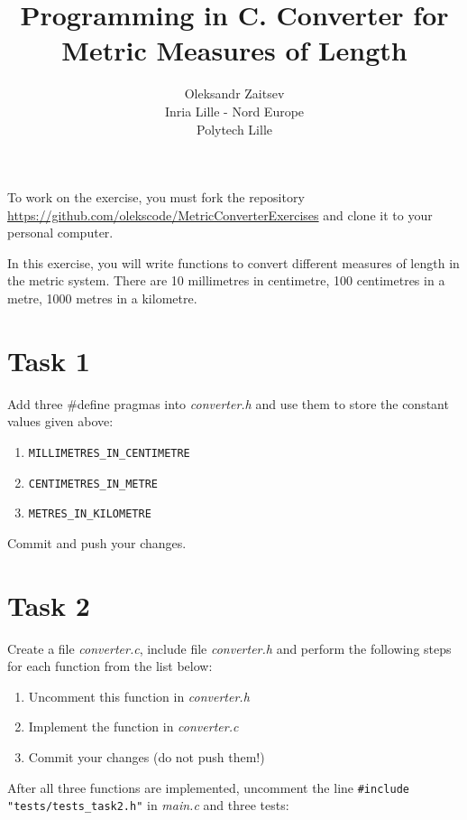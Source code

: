 \documentclass{article}
\begin{document}
\title{Programming in C. Converter for Metric Measures of Length}
\author{Oleksandr Zaitsev\\ Inria Lille - Nord Europe\\ Polytech Lille}
\date{}
\maketitle

To work on the exercise, you must fork the repository \url{https://github.com/olekscode/MetricConverterExercises} and clone it to your personal computer.

In this exercise, you will write functions to convert different measures of length in the metric system. There are 10 millimetres in centimetre, 100 centimetres in a metre, 1000 metres in a kilometre.

\section*{Task 1}

Add three \#define pragmas into \emph{converter.h} and use them to store the constant values given above:

\begin{enumerate}
\item \lstinline{MILLIMETRES_IN_CENTIMETRE}
\item \lstinline{CENTIMETRES_IN_METRE}
\item \lstinline{METRES_IN_KILOMETRE}
\end{enumerate}

Commit and push your changes.

\section*{Task 2}

Create a file \emph{converter.c}, include file \emph{converter.h} and perform the following steps for each function from the list below:

\begin{enumerate}
\item Uncomment this function in \emph{converter.h}
\item Implement the function in \emph{converter.c}
\item Commit your changes (do not push them!)
\end{enumerate}

After all three functions are implemented, uncomment the line \lstinline{#include "tests/tests_task2.h"} in \emph{main.c} and three tests:
\end{document}
